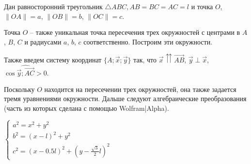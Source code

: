 \documentclass[10pt,a4paper]{article}
\begin{document}
Дан равносторонний треугольник $\triangle ABC, AB=BC=AC=l$ и точка $O$, $\|OA\|=a$, $\|OB\|=b$, $\|OC\|=c$.


Точка $O$ -- также уникальная точка пересечения трех окружностей с центрами в $A$, $B$, $C$ и радиусами $a$, $b$, $c$ соответственно. Построим эти окружности.

Также введем систему координат $\{A;\vec{x};\vec{y}\}$ так, что $\vec{x} \upuparrows \vec{AB}$, $\vec{y} \perp \vec{x}$, $\cos \widehat{\vec{y}; \vec{AC}} >0$.



Поскольку $O$ находится на пересечении трех окружностей, она также задается тремя уравнениями окружности. Дальше следуют алгебраические преобразования (часть из которых сделана с помощью Wolfram|Alpha).

$\begin{cases}
a^2 = x^2 + y^2\\
b^2=(x-l)^2 + y^2\\
c^2 = (x-0.5l)^2 + (y-\frac{\sqrt{3}}{2}l) ^ 2
\end{cases}$
\end{document}
